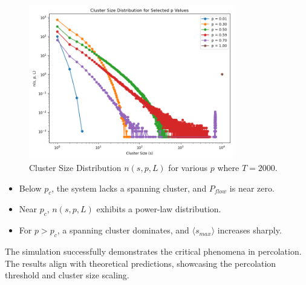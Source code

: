 \documentclass[10pt,letterpaper, onecolumn]{report}
\begin{document}
\begin{flushleft}
\begin{enumerate}
\begin{enumerate}
\begin{figure}[htbp!]
                \includegraphics[width=0.8\textwidth]{../ClusterSizeDistribution-L100T2000.png}
                \caption{Cluster Size Distribution \( n(s, p, L) \) for various \( p \) where \( T = 2000 \).}
                \label{fig:ns2000}
            \end{figure}

        \end{enumerate}
        \hfill\break
        \begin{itemize}
            \item Below \( p_c \), the system lacks a spanning cluster, and \( P_{flow} \) is near zero.
            \item Near \( p_c \), \( n(s, p, L) \) exhibits a power-law distribution.
            \item For \( p > p_c \), a spanning cluster dominates, and \( \langle s_{max} \rangle \) increases sharply.
        \end{itemize}

        \hfill\break
        The simulation successfully demonstrates the critical phenomena in percolation. The results align with theoretical predictions, showcasing the percolation threshold and cluster size scaling.


    \end{enumerate}
\end{flushleft}
\end{document}
